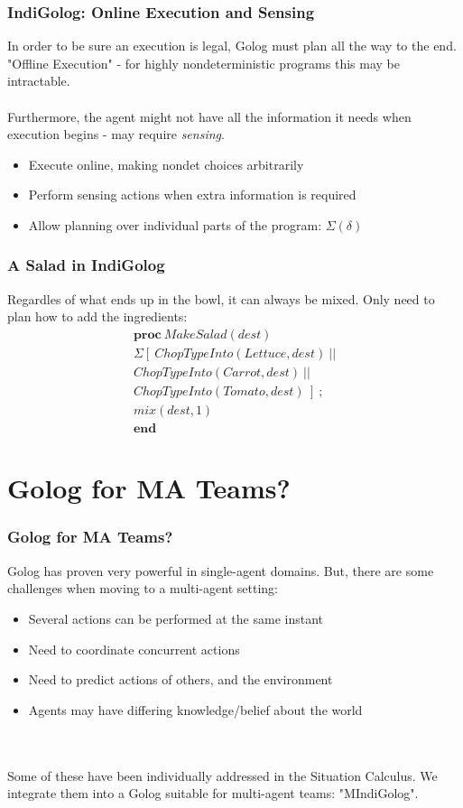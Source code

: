 \documentclass{beamer}
\begin{document}
\begin{frame}
\frametitle{IndiGolog: Online Execution and Sensing}
In order to be sure an execution is legal, Golog must plan all the way
to the end.  "Offline Execution" - for highly nondeterministic programs
this may be intractable.\\
\ \\
Furthermore, the agent might not have all the information it needs when
execution begins - may require \emph{sensing}.

\begin{itemize}
  \pause
  \item Execute online, making nondet choices arbitrarily
  \pause
  \item Perform sensing actions when extra information is required
  \pause
  \item Allow planning over individual parts of the program: $\Sigma(\delta)$
\end{itemize}
\end{frame}

\begin{frame}
\frametitle{A Salad in IndiGolog}
Regardles of what ends up in the bowl, it can always be mixed.  Only need
to plan how to add the ingredients:\[
\begin{array}{c}
\mathbf{proc}\ MakeSalad(dest)\\
\Sigma\left[\ ChopTypeInto(Lettuce,dest)\ ||\right.\\
ChopTypeInto(Carrot,dest)\ ||\\
\left.ChopTypeInto(Tomato,dest)\ \right]\ ;\\
mix(dest,1)\\
\mathbf{end}\end{array}\]
\end{frame}


\section{Golog for MA Teams?}

\begin{frame}
\frametitle{Golog for MA Teams?}
Golog has proven very powerful in single-agent domains.  But, there are
some challenges when moving to a multi-agent setting:
\begin{itemize}
  \pause
  \item Several actions can be performed at the same instant
  \pause
  \item Need to coordinate concurrent actions
  \pause
  \item Need to predict actions of others, and the environment
  \pause
  \item Agents may have differing knowledge/belief about the world
\end{itemize}
\ \\
\ \\
\pause
Some of these have been individually addressed in the Situation Calculus.
We integrate them into a Golog suitable for multi-agent teams: "MIndiGolog".

\end{frame}
\end{document}

